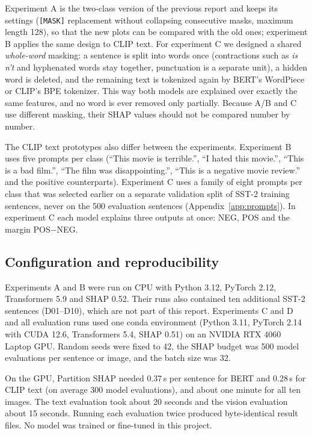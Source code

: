 \documentclass[11pt,a4paper]{article}
\begin{document}
Experiment A is the two-class version of the previous report and keeps its settings
(\texttt{[MASK]} replacement without collapsing consecutive masks, maximum length 128), so
that the new plots can be compared with the old ones; experiment B applies the same design
to CLIP text. For experiment C we designed a shared \emph{whole-word} masking: a sentence is
split into words once (contractions such as \emph{is n't} and hyphenated words stay
together, punctuation is a separate unit), a hidden word is deleted, and the remaining text
is tokenized again by BERT's WordPiece or CLIP's BPE tokenizer. This way both models are
explained over exactly the same features, and no word is ever removed only partially.
Because A/B and C use different masking, their SHAP values should not be compared number
by number.

The CLIP text prototypes also differ between the experiments. Experiment B uses five
prompts per class (``This movie is terrible.'', ``I hated this movie.'', ``This is a bad
film.'', ``The film was disappointing.'', ``This is a negative movie review.'' and the
positive counterparts). Experiment C uses a family of eight prompts per class that was
selected earlier on a separate validation split of SST-2 training sentences, never on the
500 evaluation sentences (Appendix~\ref{app:prompts}). In experiment C each model explains
three outputs at once: NEG, POS and the margin POS$-$NEG.

\subsection{Configuration and reproducibility}

Experiments A and B were run on CPU with Python 3.12, PyTorch 2.12, Transformers 5.9 and
SHAP 0.52. Their runs also contained ten additional SST-2 sentences (D01--D10), which are
not part of this report. Experiments C and D and all evaluation runs used one conda
environment (Python 3.11, PyTorch 2.14 with CUDA 12.6, Transformers 5.4, SHAP 0.51) on an
NVIDIA RTX 4060 Laptop GPU. Random seeds were fixed to 42, the SHAP budget
was 500 model evaluations per sentence or image, and the batch size was 32.

On the GPU, Partition SHAP needed 0.37\,s per sentence for BERT and 0.28\,s for CLIP text
(on average 300 model evaluations), and about one minute for all ten images. The text
evaluation took about 20 seconds and the vision evaluation about 15 seconds. Running each
evaluation twice produced byte-identical result files. No model was trained or fine-tuned
in this project.
\end{document}
